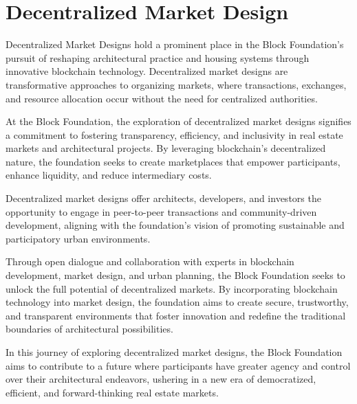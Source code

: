 \newpage
\section{Decentralized Market Design}


Decentralized Market Designs hold a prominent place in the Block Foundation's pursuit of reshaping architectural practice and housing systems through innovative blockchain technology. Decentralized market designs are transformative approaches to organizing markets, where transactions, exchanges, and resource allocation occur without the need for centralized authorities.

At the Block Foundation, the exploration of decentralized market designs signifies a commitment to fostering transparency, efficiency, and inclusivity in real estate markets and architectural projects. By leveraging blockchain's decentralized nature, the foundation seeks to create marketplaces that empower participants, enhance liquidity, and reduce intermediary costs.

Decentralized market designs offer architects, developers, and investors the opportunity to engage in peer-to-peer transactions and community-driven development, aligning with the foundation's vision of promoting sustainable and participatory urban environments.

Through open dialogue and collaboration with experts in blockchain development, market design, and urban planning, the Block Foundation seeks to unlock the full potential of decentralized markets. By incorporating blockchain technology into market design, the foundation aims to create secure, trustworthy, and transparent environments that foster innovation and redefine the traditional boundaries of architectural possibilities.

In this journey of exploring decentralized market designs, the Block Foundation aims to contribute to a future where participants have greater agency and control over their architectural endeavors, ushering in a new era of democratized, efficient, and forward-thinking real estate markets.